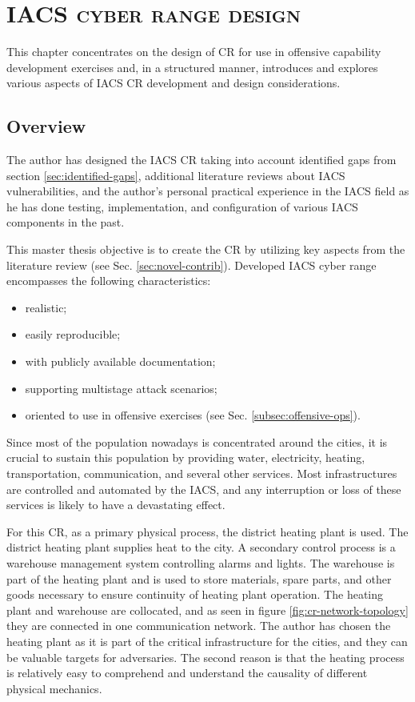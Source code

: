 \chapter{\textsc{IACS cyber range design}} \label{ch:cr-design}

This chapter concentrates on the design of CR for use in offensive capability development exercises and, in a structured manner, introduces and explores various aspects of IACS CR development and design considerations. 

\section{Overview}

The author has designed the IACS CR taking into account identified gaps from section \ref{sec:identified-gaps}, additional literature reviews about IACS vulnerabilities, and the author's personal practical experience in the IACS field as he has done testing, implementation, and configuration of various IACS components in the past.

This master thesis objective is to create the CR by utilizing key aspects from the literature review (see Sec. \ref{sec:novel-contrib}). Developed IACS cyber range encompasses the following characteristics:

\begin{itemize}
	\item realistic;
	\item easily reproducible;
	\item with publicly available documentation;
	\item supporting multistage attack scenarios;
	\item oriented to use in offensive exercises (see Sec. \ref{subsec:offensive-ops}).
\end{itemize}

Since most of the population nowadays is concentrated around the cities, it is crucial to sustain this population by providing water, electricity, heating, transportation, communication, and several other services. Most infrastructures are controlled and automated by the IACS, and any interruption or loss of these services is likely to have a devastating effect.

For this CR, as a primary physical process, the district heating plant is used. The district heating plant supplies heat to the city. A secondary control process is a warehouse management system controlling alarms and lights. The warehouse is part of the heating plant and is used to store materials, spare parts, and other goods necessary to ensure continuity of heating plant operation. The heating plant and warehouse are collocated, and as seen in figure \ref{fig:cr-network-topology} they are connected in one communication network. The author has chosen the heating plant as it is part of the critical infrastructure for the cities, and they can be valuable targets for adversaries. The second reason is that the heating process is relatively easy to comprehend and understand the causality of different physical mechanics.

